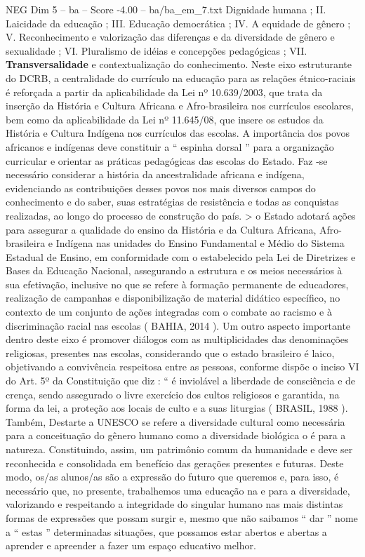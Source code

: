 \begin{textsample}{NEG Dim 5 – ba – Score -4.00 – ba/ba\_em\_7.txt}
Dignidade humana ; II.
Laicidade da educação ; III.
Educação democrática ; IV.
A equidade de gênero ; V.
Reconhecimento e valorização das diferenças e da diversidade de gênero e sexualidade ; VI.
Pluralismo de idéias e concepções pedagógicas ; VII. \textbf{Transversalidade} e contextualização do conhecimento.
Neste eixo estruturante do DCRB, a centralidade do currículo na educação para as relações étnico-raciais é reforçada a partir da aplicabilidade da Lei nº 10.639/2003, que trata da inserção da História e Cultura Africana e Afro-brasileira nos currículos escolares, bem como da aplicabilidade da Lei nº 11.645/08, que insere os estudos da História e Cultura Indígena nos currículos das escolas.
A importância dos povos africanos e indígenas deve constituir a “ espinha dorsal ” para a organização curricular e orientar as práticas pedagógicas das escolas do Estado.
Faz -se necessário considerar a história da ancestralidade africana e indígena, evidenciando as contribuições desses povos nos mais diversos campos do conhecimento e do saber, suas estratégias de resistência e todas as conquistas realizadas, ao longo do processo de construção do país. > o Estado adotará ações para assegurar a qualidade do ensino da História e da Cultura Africana, Afro-brasileira e Indígena nas unidades do Ensino Fundamental e Médio do Sistema Estadual de Ensino, em conformidade com o estabelecido pela Lei de Diretrizes e Bases da Educação Nacional, assegurando a estrutura e os meios necessários à sua efetivação, inclusive no que se refere à formação permanente de educadores, realização de campanhas e disponibilização de material didático específico, no contexto de um conjunto de ações integradas com o combate ao racismo e à discriminação racial nas escolas ( BAHIA, 2014 ).
Um outro aspecto importante dentro deste eixo é promover diálogos com as multiplicidades das denominações religiosas, presentes nas escolas, considerando que o estado brasileiro é laico, objetivando a convivência respeitosa entre as pessoas, conforme dispõe o inciso VI do Art. 5º da Constituição que diz : “ é inviolável a liberdade de consciência e de crença, sendo assegurado o livre exercício dos cultos religiosos e garantida, na forma da lei, a proteção aos locais de culto e a suas liturgias ( BRASIL, 1988 ).
Também, Destarte a UNESCO se refere a diversidade cultural como necessária para a conceituação do gênero humano como a diversidade biológica o é para a natureza.
Constituindo, assim, um patrimônio comum da humanidade e deve ser reconhecida e consolidada em benefício das gerações presentes e futuras.
Deste modo, os/as alunos/as são a expressão do futuro que queremos e, para isso, é necessário que, no presente, trabalhemos uma educação na e para a diversidade, valorizando e respeitando a integridade do singular humano nas mais distintas formas de expressões que possam surgir e, mesmo que não saibamos “ dar ” nome a “ estas ” determinadas situações, que possamos estar abertos e abertas a aprender e apreender a fazer um espaço educativo melhor.

\end{textsample}
